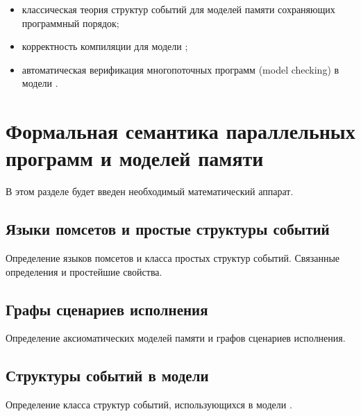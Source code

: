 \begin{itemize}
  \item классическая теория структур событий для моделей памяти
    сохраняющих программный порядок;
  \item корректность компиляции для модели \Wkm;
  \item автоматическая верификация многопоточных программ
    (model checking) в модели \WkmS.
\end{itemize}

\section{Формальная семантика параллельных программ и моделей памяти}

В этом разделе будет введен необходимый математический аппарат. 

\subsection{Языки помсетов и простые структуры событий}
\label{sec:pomsets-eventstruct}

Определение языков помсетов и класса простых структур событий.
Связанные определения и простейшие свойства. 

\subsection{Графы сценариев исполнения}

Определение аксиоматических моделей памяти и графов сценариев исполнения.

\subsection{Структуры событий в модели \Wkm}

Определение класса структур событий, использующихся в модели \Wkm.

